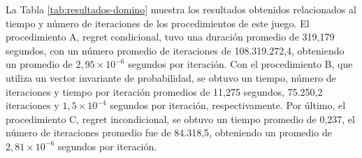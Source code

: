 La Tabla \ref{tab:resultados-domino} muestra los resultados obtenidos relacionados al tiempo y número de iteraciones de los procedimientos de este juego. El procedimiento A, regret condicional, tuvo una duración promedio de 319,179 segundos, con un número promedio de iteraciones de 108.319.272,4, obteniendo un promedio de $2,95 {\times} 10^{-6}$ segundos por iteración. Con el procedimiento B, que utiliza un vector invariante de probabilidad, se obtuvo un tiempo, número de iteraciones y tiempo por iteración promedios de 11,275 segundos, 75.250,2 iteraciones y $1,5 {\times} 10^{-4}$ segundos por iteración, respectivamente. Por último, el procedimiento C, regret incondicional, se obtuvo un tiempo promedio de 0,237, el número de iteraciones promedio fue de 84.318,5, obteniendo un promedio de $2,81 {\times} 10^{-6}$ segundos por iteración. 

